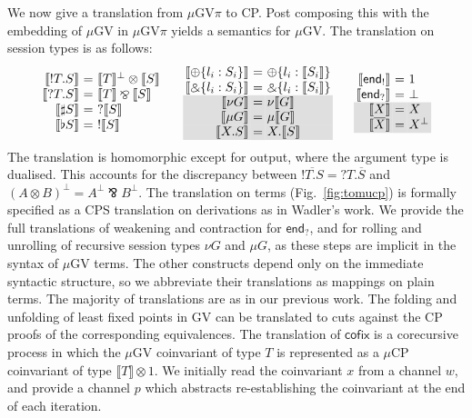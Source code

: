 \documentclass[orivec,envcountsame]{llncs}
\makeatletter
\newcommand{\with}{\mathbin\binampersand}
\newcommand{\parr}{\mathbin\bindnasrepma}
\newcommand{\cpdual}[1]{#1^\perp}
\newcommand{\cpbang}[1]{{! #1}}
\newcommand{\cpquery}[1]{{? #1}}
\newcommand{\gvdual}[1]{\overline{#1}}
\newcommand{\gvout}[2]{{!#1.#2}}
\newcommand{\gvin}[2]{{?#1.#2}}
\newcommand{\outterm}{\mkwd{end}_!}
\newcommand{\interm}{\mkwd{end}_?}
\newcommand{\gvserver}[1]{\flat #1}
\newcommand{\gvservice}[1]{\sharp #1}
\newcommand{\mkwd}[1]{\mathsf{#1}}
\newcommand{\lrkwd}{\mkwd{cofix}}
\newcommand{\cofix}{\lrkwd}
\newcommand{\tocp}[1]{\llbracket #1 \rrbracket}
\newcommand{\mucp}{$\mu\mathrm{CP}$\xspace}
\newcommand{\mugv}{$\mu\mathrm{GV}$\xspace}
\newcommand{\gvpi}{$\mu\mathrm{GV}\pi$\xspace}
\newcommand{\ba}{\begin{array}}
\newcommand{\ea}{\end{array}}
\newenvironment{eqs}{\ba{@{}r@{~}c@{~}l@{}}}{\ea}
\newcommand\shaderow{\noalign{\vskip-0.4pt}\rowcolor{shade}[0.6mm]}
\makeatother
\begin{document}
We now give a translation from \gvpi to CP. Post composing this with the embedding of \mugv in \gvpi
yields a semantics for \mugv. The translation on session types is as follows:
\small\[
\ba{@{}c@{\qquad}c@{\qquad}c@{}}
\begin{eqs}
\tocp{\gvout{T}{S}}        &=& \cpdual{\tocp{T}} \otimes \tocp{S} \\
\tocp{\gvin{T}{S}}         &=& \tocp{T} \parr \tocp{S} \\
\tocp{\gvservice{S}}       &=& \cpquery{\tocp{S}} \\
\tocp{\gvserver{S}}        &=& \cpbang{\tocp{S}} \\
\end{eqs}
&
\begin{eqs}
\tocp{\oplus \{l_i:S_i \}} &=& \oplus \{l_i:\tocp{S_i}\} \\
\tocp{\with \{l_i:S_i \}}  &=& \with \{l_i:\tocp{S_i}\} \\ \shaderow
\tocp{\nu G}               &=& \nu\tocp{G} \\ \shaderow
\tocp{\mu G}               &=& \mu\tocp{G} \\ \shaderow
\tocp{X.S}                 &=& X.\tocp{S} \\
\end{eqs}
&
\begin{eqs}
\tocp{\outterm}            &=& 1 \\
\tocp{\interm}             &=& \bot \\ \shaderow
\tocp{X}                   &=& X \\ \shaderow
\tocp{\gvdual{X}}          &=& \cpdual{X} \\
\end{eqs}\\
\ea
\]\normalsize
The translation is homomorphic except for output, where the argument type is dualised. This accounts
for the discrepancy between $\gvdual{\gvout{T}{S}} = \gvin{T}{\gvdual{S}}$ and $\cpdual{(A \otimes
  B)} = \cpdual{A} \parr \cpdual{B}.$
%
The translation on terms (Fig.~\ref{fig:tomucp}) is formally specified as a CPS translation on
derivations as in Wadler's work. We provide the full translations of weakening and contraction for
$\interm$, and for rolling and unrolling of recursive session types $\nu G$ and $\mu G$, as these
steps are implicit in the syntax of \mugv terms. The other constructs depend only on the immediate
syntactic structure, so we abbreviate their translations as mappings on plain terms. The majority of
translations are as in our previous work.  The folding and unfolding of least fixed points in GV can
be translated to cuts against the CP proofs of the corresponding equivalences. The translation of
$\cofix$ is a corecursive process in which the \mugv coinvariant of type $T$ is represented as a
\mucp coinvariant of type $\tocp{T} \otimes 1$.  We initially read the coinvariant $x$ from a
channel $w$, and provide a channel $p$ which abstracts re-establishing the coinvariant at the end of
each iteration.
\end{document}

